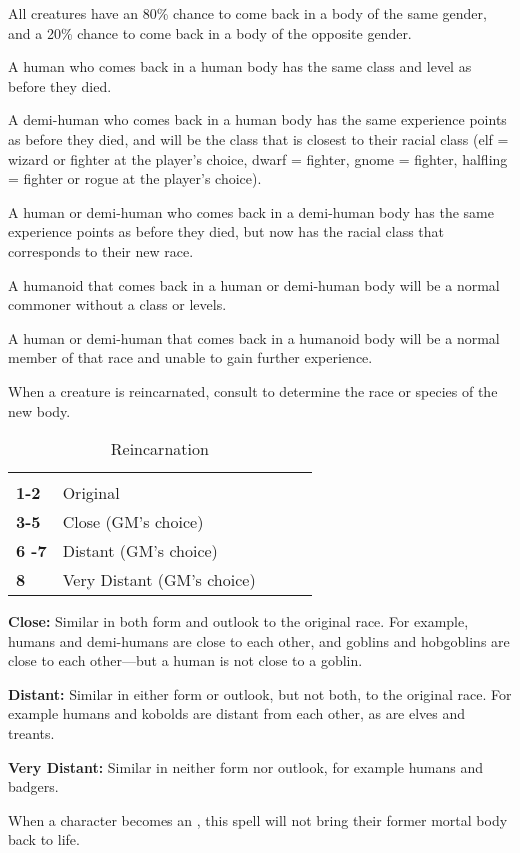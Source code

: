 \begin{multicols*}{2}
All creatures have an 80\% chance to come back in a body of the same gender, and a 20\% chance to come back in a body of the opposite gender.

A human who comes back in a human body has the same class and level as before they died.

A demi-human who comes back in a human body has the same experience points as before they died, and will be the class that is closest to their racial class (elf = wizard or fighter at the player’s choice, dwarf = fighter, gnome = fighter, halfling = fighter or rogue at the player’s choice).

A human or demi-human who comes back in a demi-human body has the same experience points as before they died, but now has the racial class that corresponds to their new race.

A humanoid that comes back in a human or demi-human body will be a normal commoner without a class or levels.

A human or demi-human that comes back in a humanoid body will be a normal member of that race and unable to gain further experience.

When a creature is reincarnated, consult  to determine the race or species of the new body.
\begin {table}[H]
  \caption{Reincarnation}\label{tab:Reincarnation}
  \begin{tabularx}{\columnwidth}{>{\bfseries}YYYYY}
	 & \\
	1-2 & Original\\
	3-5 & Close (GM’s choice)\\
	6 -7 & Distant (GM’s choice)\\
	8 & Very Distant (GM’s choice)
  \end {tabularx}
\end {table}

\textbf{Close:} Similar in both form and outlook to the original race. For example, humans and demi-humans are close to each other, and goblins and hobgoblins are close to each other—but a human is not close to a goblin.

\textbf{Distant:} Similar in either form or outlook, but not both, to the original race. For example humans and kobolds are distant from each other, as are elves and treants.

\textbf{Very Distant:} Similar in neither form nor outlook, for example humans and badgers.

When a character becomes an , this spell will not bring their former mortal body back to life.


\end{multicols*}
